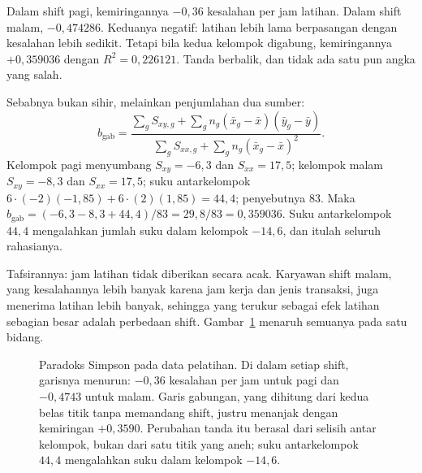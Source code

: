 Dalam shift pagi, kemiringannya $-0{,}36$ kesalahan per jam latihan. Dalam shift malam,
$-0{,}474286$. Keduanya negatif: latihan lebih lama berpasangan dengan kesalahan lebih
sedikit. Tetapi bila kedua kelompok digabung, kemiringannya $+0{,}359036$ dengan
$R^2=0{,}226121$. Tanda berbalik, dan tidak ada satu pun angka yang salah.

Sebabnya bukan sihir, melainkan penjumlahan dua sumber:
\[
b_{\text{gab}}=\frac{\sum_g S_{xy,g}+\sum_g n_g(\bar x_g-\bar x)(\bar y_g-\bar y)}
{\sum_g S_{xx,g}+\sum_g n_g(\bar x_g-\bar x)^2}.
\]
Kelompok pagi menyumbang $S_{xy}=-6{,}3$ dan $S_{xx}=17{,}5$; kelompok malam
$S_{xy}=-8{,}3$ dan $S_{xx}=17{,}5$; suku antarkelompok
$6\cdot(-2)(-1{,}85)+6\cdot(2)(1{,}85)=44{,}4$; penyebutnya $83$. Maka
$b_{\text{gab}}=(-6{,}3-8{,}3+44{,}4)/83=29{,}8/83=0{,}359036$. Suku antarkelompok
$44{,}4$ mengalahkan jumlah suku dalam kelompok $-14{,}6$, dan itulah seluruh rahasianya.

Tafsirannya: jam latihan tidak diberikan secara acak. Karyawan shift malam, yang
kesalahannya lebih banyak karena jam kerja dan jenis transaksi, juga menerima latihan
lebih banyak, sehingga yang terukur sebagai efek latihan sebagian besar adalah
perbedaan shift. Gambar~\ref{fig:simpson} menaruh semuanya pada satu bidang.

\begin{figure}[htbp]
\centering
{}
\caption{Paradoks Simpson pada data pelatihan. Di dalam setiap shift, garisnya menurun:
$-0{,}36$ kesalahan per jam untuk pagi dan $-0{,}4743$ untuk malam. Garis gabungan,
yang dihitung dari kedua belas titik tanpa memandang shift, justru menanjak dengan
kemiringan $+0{,}3590$. Perubahan tanda itu berasal dari selisih antar kelompok, bukan
dari satu titik yang aneh; suku antarkelompok $44{,}4$ mengalahkan suku dalam kelompok
$-14{,}6$.}
\label{fig:simpson}
\end{figure}

